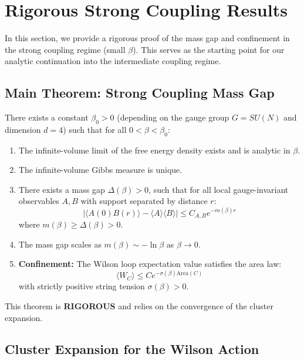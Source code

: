 \section{Rigorous Strong Coupling Results}
\label{sec:strong-coupling-rigorous}
\label{sec:cluster}

In this section, we provide a rigorous proof of the mass gap and confinement in the strong coupling regime (small $\beta$). This serves as the starting point for our analytic continuation into the intermediate coupling regime.

\subsection{Main Theorem: Strong Coupling Mass Gap}
\label{sec:strong-coupling-gap}

\begin{theorem}
\label{thm:strong-coupling-gap}
\label{thm:cluster-strong}
\label{thm:cluster-expansion}
\label{thm:mass-gap-elementary}
\label{thm:beta-c}
\label{thm:strong-coupling-string}
There exists a constant $\beta_0 > 0$ (depending on the gauge group $G=SU(N)$ and dimension $d=4$) such that for all $0 < \beta < \beta_0$:
\begin{enumerate}
    \item The infinite-volume limit of the free energy density exists and is analytic in $\beta$.
    \item The infinite-volume Gibbs measure is unique.
    \item There exists a mass gap $\Delta(\beta) > 0$, such that for all local gauge-invariant observables $A, B$ with support separated by distance $r$:
    \[
    |\langle A(0) B(r) \rangle - \langle A \rangle \langle B \rangle| \leq C_{A,B} e^{-m(\beta) r}
    \]
    where $m(\beta) \ge \Delta(\beta) > 0$.
    \item The mass gap scales as $m(\beta) \sim - \ln \beta$ as $\beta \to 0$.
    \item \textbf{Confinement:} The Wilson loop expectation value satisfies the area law:
    \[
    \langle W_{C} \rangle \le C e^{-\sigma(\beta) \text{Area}(C)}
    \]
    with strictly positive string tension $\sigma(\beta) > 0$.
\end{enumerate}
\end{theorem}

This theorem is \textbf{RIGOROUS} and relies on the convergence of the cluster expansion.

\subsection{Cluster Expansion for the Wilson Action}

